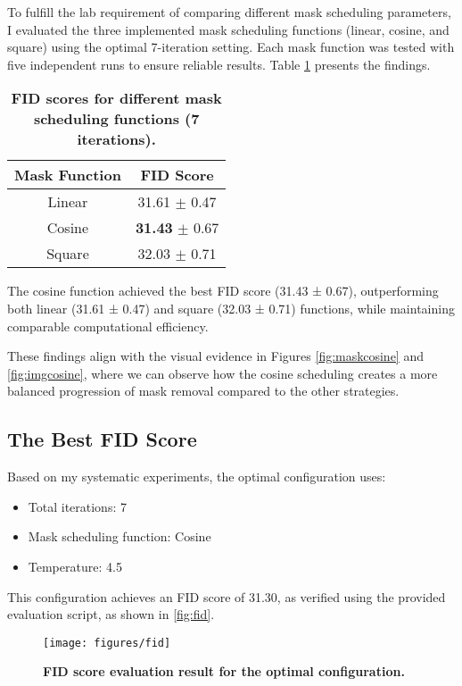 \documentclass[twocolumn,a4paper]{article}
\begin{document}
To fulfill the lab requirement of comparing different mask scheduling parameters, I evaluated the three implemented mask scheduling functions (linear, cosine, and square) using the optimal 7-iteration setting. Each mask function was tested with five independent runs to ensure reliable results. Table \ref{tab:mask_scheduling} presents the findings.

\begin{table}
    \centering
    \caption{\textbf{FID scores for different mask scheduling functions (7 iterations).}}
    \label{tab:mask_scheduling}

    \begin{tabular}{cc}
        \toprule
        \textbf{Mask Function} & \textbf{FID Score} \\
        \midrule
        Linear & 31.61 $\pm$ 0.47 \\
        Cosine & \textbf{31.43} $\pm$ 0.67  \\
        Square & 32.03 $\pm$ 0.71 \\
        \bottomrule
    \end{tabular}
\end{table}

The cosine function achieved the best FID score (31.43 ± 0.67), outperforming both linear (31.61 ± 0.47) and square (32.03 ± 0.71) functions, while maintaining comparable computational efficiency.

These findings align with the visual evidence in Figures \ref{fig:maskcosine} and \ref{fig:imgcosine}, where we can observe how the cosine scheduling creates a more balanced progression of mask removal compared to the other strategies.

\subsection{The Best FID Score}

Based on my systematic experiments, the optimal configuration uses:
\begin{itemize}
\item Total iterations: 7
\item Mask scheduling function: Cosine
\item Temperature: 4.5
\end{itemize}

This configuration achieves an FID score of 31.30, as verified using the provided evaluation script, as shown in \autoref{fig:fid}.

\begin{figure}[H]
\centering
\texttt{[image: figures/fid]}
\caption{\textbf{FID score evaluation result for the optimal configuration.}}
\label{fig:fid}
\end{figure}
\end{document}
